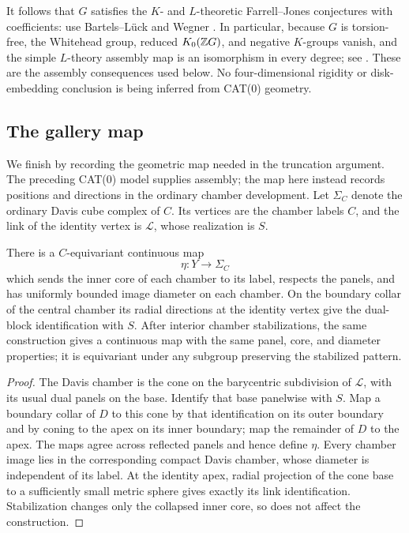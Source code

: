 It follows that $G$ satisfies the $K$- and $L$-theoretic Farrell--Jones
conjectures with coefficients: use Bartels--L\"uck
\cite[Theorem~B(ii)]{BL} and Wegner
\cite[Theorems~1.1 and~3.4]{Wegner}.  In particular, because $G$ is
torsion-free, the Whitehead group, reduced $K_0(\mathbb Z G)$, and negative
$K$-groups vanish, and the simple $L$-theory assembly map is an
isomorphism in every degree; see \cite[Proposition~0.3(i)]{BL}.
These are the assembly consequences used below.  No four-dimensional
rigidity or disk-embedding conclusion is being inferred from CAT(0)
geometry.

\subsection{The gallery map}

We finish by recording the geometric map needed in the truncation
argument. The preceding CAT(0) model supplies assembly; the map here
instead records positions and directions in the ordinary chamber
development. Let $\Sigma_C$ denote the ordinary Davis cube complex of
$C$.  Its vertices are the chamber labels $C$, and the link of the
identity vertex is $\mathcal L$, whose realization is $S$.

\begin{lemma}
\label{rf:davis-map}
There is a $C$-equivariant continuous map
\[
 \eta:Y\longrightarrow\Sigma_C
\]
which sends the inner core of each chamber to its label, respects
the panels, and has uniformly bounded image diameter on each chamber.
On the boundary collar of the central chamber its radial directions
at the identity vertex give the dual-block identification with $S$.
After interior chamber stabilizations, the same construction gives a
continuous map with the same panel, core, and diameter properties;
it is equivariant under any subgroup preserving the stabilized pattern.
\end{lemma}

\begin{proof}
The Davis chamber is the cone on the barycentric subdivision of
$\mathcal L$, with its usual dual panels on the base.  Identify that
base panelwise with $S$.  Map a boundary collar of $D$ to this cone
by that identification on its outer boundary and by coning to the
apex on its inner boundary; map the remainder of $D$ to the apex.
The maps agree across reflected panels and hence define $\eta$.
Every chamber image lies in the corresponding compact Davis chamber,
whose diameter is independent of its label.  At the identity apex,
radial projection of the cone base to a sufficiently small metric
sphere gives exactly its link identification.  Stabilization changes
only the collapsed inner core, so does not affect the construction.
\end{proof}
